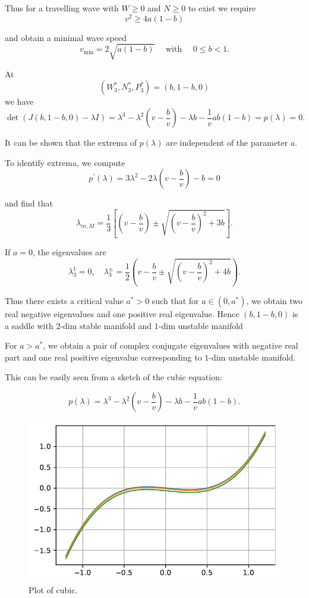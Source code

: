\documentclass[
  letterpaper,
  DIV=11,
  numbers=noendperiod]{scrreprt}
\theoremstyle{definition}
\theoremstyle{plain}
\theoremstyle{plain}
\theoremstyle{remark}
\begin{document}
Thus for a travelling wave with \(W\geq 0\) and \(N \geq 0\) to exist we
require \[
v^2 \geq  4 a(1-b)
\]

and obtain a minimal wave speed \[
v_\text{min}=2\sqrt{a(1-b)}   \quad \text{ with } \quad  0\leq b<1.
\]

At \[
(W^\ast_3, N^\ast_3, P^\ast_3) =(b, 1-b, 0)
\] we have \[
\det(J(b,1-b,0) - \lambda I)= \lambda^3 - \lambda^2(v- \frac b v) - \lambda b - \frac 1 v ab(1-b) = p(\lambda) =0.
\]

It can be shown that the extrema of \(p(\lambda)\) are independent of
the parameter \(a\).

To identify extrema, we compute \[
p^\prime(\lambda) = 3 \lambda^2 - 2 \lambda \left( v - \frac b v\right) - b = 0
\]

and find that \[
\lambda_{m,M}= \frac 13 \left[ \left(v - \frac bv \right) \pm \sqrt{ \left(v - \frac bv\right) ^2 + 3 b } \right].
\]

If \(a=0\), the eigenvalues are \[
\lambda_3^1 = 0, \quad \lambda_3^\pm = \frac 12 \left( v - \frac bv \pm \sqrt{\left(v - \frac bv\right)^2 + 4 b} \right).
\]

Thus there exists a critical value \(a^\ast>0\) such that for
\(a \in (0, a^\ast)\), we obtain two real negative eigenvalues and one
positive real eigenvalue. Hence \((b, 1-b, 0)\) is a saddle with
\(2\)-dim stable manifold and \(1\)-dim unstable manifold

For \(a>a^\ast\), we obtain a pair of complex conjugate eigenvalues with
negative real part and one real positive eigenvalue corresponding to
\(1\)-dim unstable manifold.

This can be easily seen from a sketch of the cubic equation:

\[
p(\lambda) = \lambda^3 - \lambda^2(v- \frac b v) - \lambda b - \frac 1 v ab(1-b).
\]

\begin{figure}

{\centering \includegraphics{LotkaVolteraPDE_files/figure-pdf/fig-cubic-output-1.pdf}

}

\caption{\label{fig-cubic}Plot of cubic.}

\end{figure}
\end{document}
